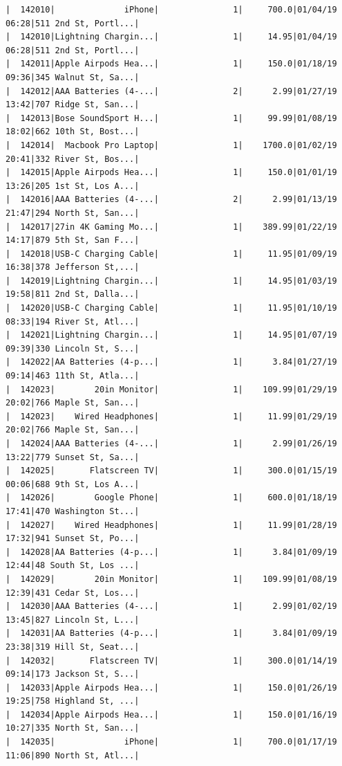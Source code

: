 \documentclass[
  letterpaper,
  DIV=11,
  numbers=noendperiod]{scrartcl}
\begin{document}
\begin{verbatim}
|  142010|              iPhone|               1|     700.0|01/04/19 06:28|511 2nd St, Portl...|
|  142010|Lightning Chargin...|               1|     14.95|01/04/19 06:28|511 2nd St, Portl...|
|  142011|Apple Airpods Hea...|               1|     150.0|01/18/19 09:36|345 Walnut St, Sa...|
|  142012|AAA Batteries (4-...|               2|      2.99|01/27/19 13:42|707 Ridge St, San...|
|  142013|Bose SoundSport H...|               1|     99.99|01/08/19 18:02|662 10th St, Bost...|
|  142014|  Macbook Pro Laptop|               1|    1700.0|01/02/19 20:41|332 River St, Bos...|
|  142015|Apple Airpods Hea...|               1|     150.0|01/01/19 13:26|205 1st St, Los A...|
|  142016|AAA Batteries (4-...|               2|      2.99|01/13/19 21:47|294 North St, San...|
|  142017|27in 4K Gaming Mo...|               1|    389.99|01/22/19 14:17|879 5th St, San F...|
|  142018|USB-C Charging Cable|               1|     11.95|01/09/19 16:38|378 Jefferson St,...|
|  142019|Lightning Chargin...|               1|     14.95|01/03/19 19:58|811 2nd St, Dalla...|
|  142020|USB-C Charging Cable|               1|     11.95|01/10/19 08:33|194 River St, Atl...|
|  142021|Lightning Chargin...|               1|     14.95|01/07/19 09:39|330 Lincoln St, S...|
|  142022|AA Batteries (4-p...|               1|      3.84|01/27/19 09:14|463 11th St, Atla...|
|  142023|        20in Monitor|               1|    109.99|01/29/19 20:02|766 Maple St, San...|
|  142023|    Wired Headphones|               1|     11.99|01/29/19 20:02|766 Maple St, San...|
|  142024|AAA Batteries (4-...|               1|      2.99|01/26/19 13:22|779 Sunset St, Sa...|
|  142025|       Flatscreen TV|               1|     300.0|01/15/19 00:06|688 9th St, Los A...|
|  142026|        Google Phone|               1|     600.0|01/18/19 17:41|470 Washington St...|
|  142027|    Wired Headphones|               1|     11.99|01/28/19 17:32|941 Sunset St, Po...|
|  142028|AA Batteries (4-p...|               1|      3.84|01/09/19 12:44|48 South St, Los ...|
|  142029|        20in Monitor|               1|    109.99|01/08/19 12:39|431 Cedar St, Los...|
|  142030|AAA Batteries (4-...|               1|      2.99|01/02/19 13:45|827 Lincoln St, L...|
|  142031|AA Batteries (4-p...|               1|      3.84|01/09/19 23:38|319 Hill St, Seat...|
|  142032|       Flatscreen TV|               1|     300.0|01/14/19 09:14|173 Jackson St, S...|
|  142033|Apple Airpods Hea...|               1|     150.0|01/26/19 19:25|758 Highland St, ...|
|  142034|Apple Airpods Hea...|               1|     150.0|01/16/19 10:27|335 North St, San...|
|  142035|              iPhone|               1|     700.0|01/17/19 11:06|890 North St, Atl...|

\end{verbatim}
\end{document}
